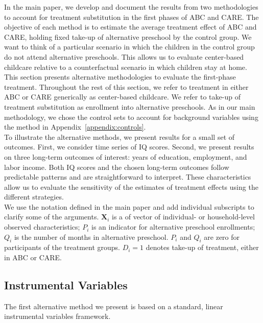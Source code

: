 \begin{appendices}
\noindent In the main paper, we develop and document the results from two methodologies to account for treatment substitution in the first phases of ABC and CARE. The objective of each method is to estimate the average treatment effect of ABC and CARE, holding fixed take-up of alternative preschool by the control group. We want to think of a particular scenario in which the children in the control group do not attend alternative preschools. This allows us to evaluate center-based childcare relative to a counterfactual scenario in which children stay at home.\\

\noindent This section presents alternative methodologies to evaluate the first-phase treatment. Throughout the rest of this section, we refer to treatment in either ABC or CARE generically as center-based childcare. We refer to take-up of treatment substitution as enrollment into alternative preschools. As in our main methodology, we chose the control sets to account for background variables using the method in Appendix~\ref{appendix:controls}.\\

\noindent To illustrate the alternative methods, we present results for a small set of outcomes. First, we consider time series of IQ scores. Second, we present results on three long-term outcomes of interest: years of education, employment, and labor income. Both IQ scores and the chosen long-term outcomes follow predictable patterns and are straightforward to interpret. These characteristics allow us to evaluate the sensitivity of the estimates of treatment effects using the different strategies.\\

\noindent We use the notation defined in the main paper and add individual subscripts to clarify some of the arguments. $\mathbf{X}_{i}$ is a of vector of individual- or household-level observed characteristics; $P_i$ is an indicator for alternative preschool enrollments; $Q_{i}$ is the number of months in alternative preschool. $P_i$ and $Q_i$ are zero for participants of the treatment groups. $D_i=1$ denotes take-up of treatment, either in ABC or CARE.

\subsection{Instrumental Variables}

\noindent The first alternative method we present is based on a standard, linear instrumental variables framework.


\end{appendices}
